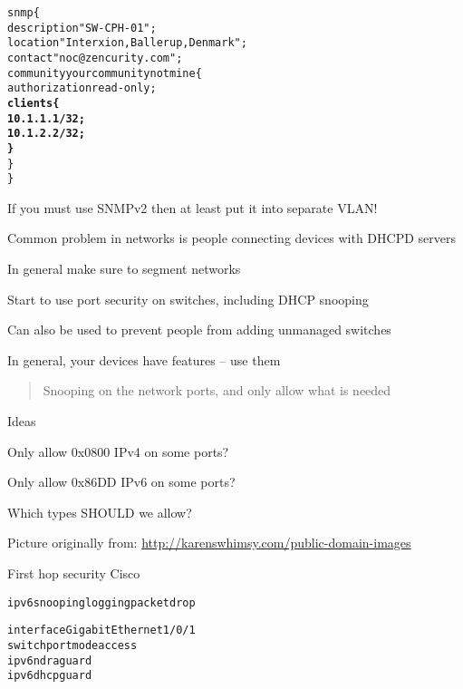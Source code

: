 \documentclass[Screen16to9,17pt]{foils}
\begin{document}

\begin{alltt}
snmp \{
    description "SW-CPH-01";
    location "Interxion, Ballerup, Denmark";
    contact "noc@zencurity.com";
    community yourcommunitynotmine \{
        authorization read-only;
        {\bf clients \{
               10.1.1.1/32;
               10.1.2.2/32;
        \}    }
    \}
\}
\end{alltt}

If you must use SNMPv2 then at least put it into separate VLAN! {\myalert}


\begin{list1}
\item Common problem in networks is people connecting devices with DHCPD servers
\item In general make sure to segment networks
\item Start to use port security on switches, including DHCP snooping\\
\item Can also be used to prevent people from adding unmanaged switches
\item In general, your devices have features -- use them
\end{list1}




\begin{quote}
Snooping on the network ports, and only allow what is needed
\end{quote}

Ideas
\begin{list2}
\item Only allow 0x0800 IPv4 on some ports?
\item Only allow 0x86DD IPv6 on some ports?
\item Which types SHOULD we allow?
\end{list2}



\centerline{Picture originally from: \url{http://karenswhimsy.com/public-domain-images}}




First hop security Cisco
\begin{alltt}\small
ipv6 snooping logging packet drop

interface GigabitEthernet1/0/1
    switchport mode access
    ipv6 nd raguard
    ipv6 dhcp guard
\end{alltt}
\end{document}
